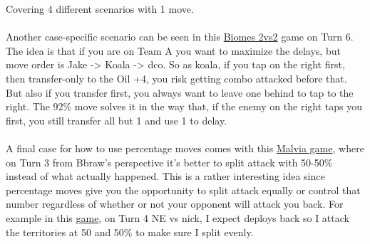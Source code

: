 Covering 4 different scenarios with 1 move.
\\
\\
Another case-specific scenario can be seen in this \href{https://www.warzone.com/MultiPlayer?GameID=38696112}{Biomes 2vs2} game on Turn 6. The idea is that if you are on Team A you want to maximize the delays, but move order is Jake -> Koala -> dco. So as koala, if you tap on the right first, then transfer-only to the Oil +4, you risk getting combo attacked before that. But also if you transfer first, you always want to leave one behind to tap to the right. The 92\% move solves it in the way that, if the enemy on the right taps you first, you still transfer all but 1 and use 1 to delay.
\\
\\
A final case for how to use percentage moves comes with this \href{https://www.warzone.com/MultiPlayer?GameID=14309659}{Malvia game}, where on Turn 3 from Bbraw's perspective it's better to split attack with 50-50\% instead of what actually happened. This is a rather interesting idea since percentage moves give you the opportunity to split attack equally or control that number regardless of whether or not your opponent will attack you back. For example in this \href{https://www.warzone.com/MultiPlayer?GameID=41472964}{game}, on Turn 4 NE vs nick, I expect deploys back so I attack the territories at 50 and 50\% to make sure I split evenly.

